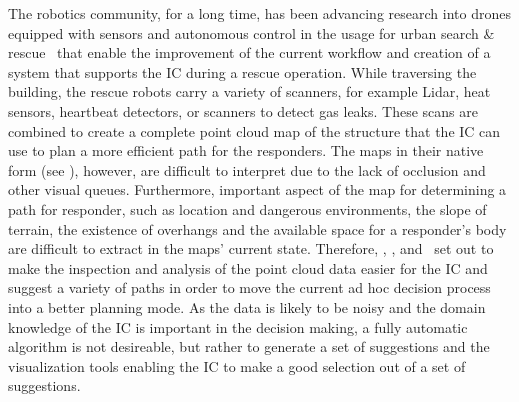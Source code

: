 The robotics community, for a long time, has been advancing research into drones equipped with sensors and autonomous control in the usage for urban search \& rescue~\cite{liu2013robotic} that enable the improvement of the current workflow and creation of a system that supports the IC during a rescue operation.  While traversing the building, the rescue robots carry a variety of scanners, for example Lidar, heat sensors, heartbeat detectors, or scanners to detect gas leaks.  These scans are combined to create a complete  point cloud map of the structure that the IC can use to plan a more efficient path for the responders.  The maps in their native form (see ), however, are difficult to interpret due to the lack of occlusion and other visual queues.  Furthermore, important aspect of the map for determining a path for responder, such as location and dangerous environments, the slope of terrain, the existence of overhangs and the available space for a responder's body are difficult to extract in the maps' current state.  Therefore, \paperVMV, \paperSSRR, and \paperCGF\ set out to make the inspection and analysis of the  point cloud data easier for the IC and suggest a variety of paths in order to move the current ad hoc decision process into a better planning mode.  As the data is likely to be noisy and the domain knowledge of the IC is important in the decision making, a fully automatic algorithm is not desireable, but rather to generate a set of suggestions and the visualization tools enabling the IC to make a good selection out of a set of suggestions.


